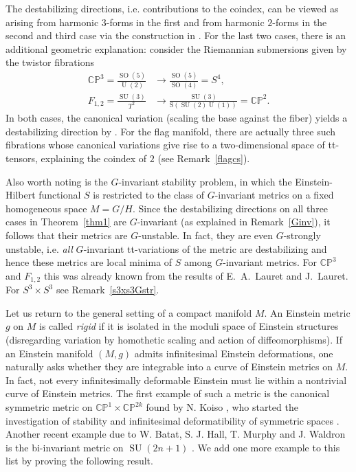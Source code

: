 \documentclass[12pt]{scrartcl}
\theoremstyle{plain}
\theoremstyle{definition}
\newcommand{\CP}{\mathbb{CP}}%
\newcommand{\U}{\operatorname{U}}%
\newcommand{\SU}{\operatorname{SU}}%
\newcommand{\SO}{\operatorname{SO}}%
\begin{document}
The destabilizing directions, i.e. contributions to the coindex, can be viewed as arising from harmonic $3$-forms in the first and from harmonic $2$-forms in the second and third case via the construction in \cite{nkstability}. For the last two cases, there is an additional geometric explanation: consider the Riemannian submersions given by the twistor fibrations
\begin{align*}
\CP^3=\frac{\SO(5)}{\U(2)}&\longrightarrow\frac{\SO(5)}{\SO(4)}=S^4,\\
F_{1,2}=\frac{\SU(3)}{T^2}&\longrightarrow\frac{\SU(3)}{\mathrm{S}(\SU(2)\U(1))}=\CP^2.
\end{align*}
In both cases, the canonical variation (scaling the base against the fiber) yields a destabilizing direction by \cite[Prop.~4.4]{WW}. For the flag manifold, there are actually three such fibrations whose canonical variations give rise to a two-dimensional space of tt-tensors, explaining the coindex of $2$ (see Remark~\ref{flagcs}).

Also worth noting is the $G$-invariant stability problem, in which the Einstein-Hilbert functional $S$ is restricted to the class of $G$-invariant metrics on a fixed homogeneous space $M=G/H$. Since the destabilizing directions on all three cases in Theorem~\ref{thm1} are $G$-invariant (as explained in Remark~\ref{Ginv}), it follows that their metrics are $G$-unstable. In fact, they are even $G$-strongly unstable, i.e. \emph{all} $G$-invariant tt-variations of the metric are destabilizing and hence these metrics are local minima of $S$ among $G$-invariant metrics. For $\CP^3$ \cite[Table~1, 7a]{ejlauret} and $F_{1,2}$ \cite[Table~2]{jlauret} this was already known from the results of E.~A.~Lauret and J.~Lauret. For $S^3\times S^3$ see Remark~\ref{s3xs3Gstr}.

Let us return to the general setting of a compact manifold $M$. An Einstein metric $g$ on $M$ is called \emph{rigid} if it is isolated in the moduli space of Einstein structures (disregarding variation by homothetic scaling and action of diffeomorphisms). If an Einstein manifold $(M,g)$ admits infinitesimal Einstein deformations, one naturally asks whether they are integrable into a curve of Einstein metrics on $M$. In fact, not every infinitesimally deformable Einstein must lie within a nontrivial curve of Einstein metrics. The first example of such a metric is the canonical symmetric metric on $\CP^1\times\CP^{2k}$ found by N. Koiso \cite{koisorigidity}, who started the investigation of stability and infinitesimal deformatibility of symmetric spaces \cite{koiso}. Another recent example due to W. Batat, S. J. Hall, T. Murphy and J. Waldron is the bi-invariant metric on $\SU(2n+1)$ \cite{sunrigidity}. We add one more example to this list by proving the following result.
\end{document}
